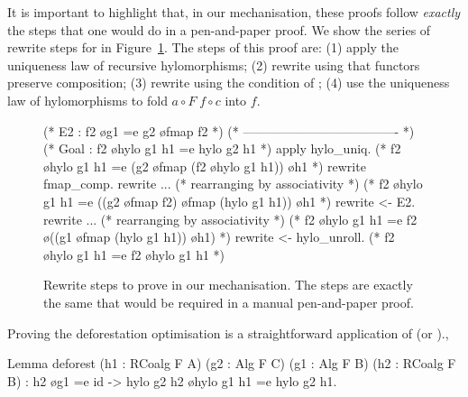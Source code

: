 \documentclass[a4paper,anonymous, UKenglish,cleveref, autoref, thm-restate]{lipics-v2021}
\begin{document}
\noindent
It is important to highlight that, in our mechanisation, these proofs follow
\emph{exactly} the steps that one would do in a pen-and-paper proof.  We show
the series of rewrite steps for  in
Figure~\ref{fig:proof-fusion-l}. The steps of this proof are: (1) apply the
uniqueness law of recursive hylomorphisms; (2) rewrite using that
functors preserve composition; (3) rewrite using the
condition of ; (4) use the uniqueness law of hylomorphisms to
fold $a \circ F \; f \circ c$ into $f$.
\begin{figure}[t!]
\begin{coqcode}
(* E2 : f2 \o g1 =e g2 \o fmap f2 *)
(* ------------------------------------- *)
(* Goal : f2 \o hylo g1 h1 =e hylo g2 h1 *)
apply hylo_uniq.
       (* f2 \o hylo g1 h1 =e (g2 \o fmap (f2 \o hylo g1 h1)) \o h1        *)
rewrite fmap_comp.
rewrite ... (* rearranging by associativity *)
       (* f2 \o hylo g1 h1 =e ((g2 \o fmap f2) \o fmap (hylo g1 h1)) \o h1 *)
rewrite <- E2.
rewrite ... (* rearranging by associativity *)
       (* f2 \o hylo g1 h1 =e f2 \o ((g1 \o fmap (hylo g1 h1)) \o h1)      *)
rewrite <- hylo_unroll.
       (* f2 \o hylo g1 h1 =e f2 \o hylo g1 h1                             *)
\end{coqcode}

  \vspace{-.5cm}
  \caption{Rewrite steps to prove  in our mechanisation. The
steps are exactly the same that would be required in a manual pen-and-paper
proof.}
\label{fig:proof-fusion-l}
\end{figure}


Proving the deforestation optimisation is a straightforward application
of  (or ).,
\begin{coqcode}
Lemma deforest (h1 : RCoalg F A) (g2 : Alg F C) (g1 : Alg F B) (h2 : RCoalg F B)
  : h2 \o g1 =e id -> hylo g2 h2 \o hylo g1 h1 =e hylo g2 h1.
\end{coqcode}
\end{document}
